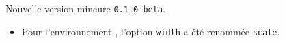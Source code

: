 Nouvelle version mineure \verb+0.1.0-beta+.

\begin{itemize}[itemsep=.5em]
    \item Pour l'environnement , l'option \verb#width# a été renommée \verb#scale#.


\end{itemize}

\separation
